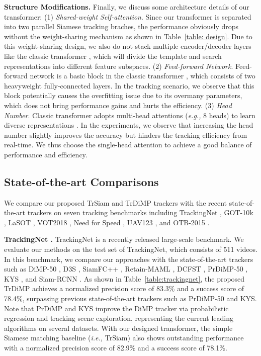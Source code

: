 \documentclass[10pt,twocolumn,letterpaper]{article}
\begin{document}
{\noindent \bf Structure Modifications.} Finally, we discuss some architecture details of our transformer:
{(1)} \emph{Shared-weight Self-attention}. Since our transformer is separated into two parallel Siamese tracking braches, the performance obviously drops without the weight-sharing mechanism as shown in Table~\ref{table: design}.
Due to this weight-sharing design, we also do not stack multiple encoder/decoder layers like the classic transformer \cite{Transformer}, which will divide the template and search representations into different feature subspaces.
{(2)} \emph{Feed-forward Network}. Feed-forward network is a basic block in the classic transformer \cite{Transformer}, which consists of two heavyweight fully-connected layers.
In the tracking scenario, we observe that this block potentially causes the overfitting issue due to its overmany parameters, which does not bring performance gains and hurts the efficiency.
{(3)}  \emph{Head Number}. Classic transformer adopts multi-head attentions (\emph{e.g.,} 8 heads) to learn diverse representations \cite{Transformer}. 
In the experiments, we observe that increasing the head number slightly improves the accuracy but hinders the tracking efficiency from real-time.
We thus choose the single-head attention to achieve a good balance of performance and efficiency.



\subsection{State-of-the-art Comparisons}


We compare our proposed TrSiam and TrDiMP trackers with the recent state-of-the-art trackers on seven tracking benchmarks including TrackingNet \cite{2018trackingnet}, GOT-10k \cite{GOT10k}, LaSOT \cite{LaSOT}, VOT2018 \cite{VOT2018}, Need for Speed \cite{NFSdataset}, UAV123 \cite{UAV123}, and OTB-2015 \cite{OTB-2015}.




{\noindent \bf TrackingNet \cite{2018trackingnet}.} TrackingNet is a recently released large-scale benchmark. We evaluate our methods on the test set of TrackingNet, which consists of 511 videos. 
In this benchmark, we compare our approaches with the state-of-the-art trackers such as DiMP-50 \cite{DiMP}, D3S \cite{D3S}, SiamFC++ \cite{SiamFC++}, Retain-MAML \cite{MAML}, DCFST \cite{DCFST}, PrDiMP-50 \cite{PrDiMP}, KYS \cite{KYS}, and Siam-RCNN \cite{SiamRCNN}.
As shown in Table~\ref{table:trackingnet}, the proposed TrDiMP achieves a normalized precision score of 83.3\% and a success score of 78.4\%, surpassing previous state-of-the-art trackers such as PrDiMP-50 and KYS.
Note that PrDiMP and KYS improve the DiMP tracker via probabilistic regression and tracking scene exploration, representing the current leading algorithms on several datasets.
With our designed transformer, the simple Siamese matching baseline (\emph{i.e.,} TrSiam) also shows outstanding performance with a normalized precision score of 82.9\% and a success score of 78.1\%. 
\end{document}
